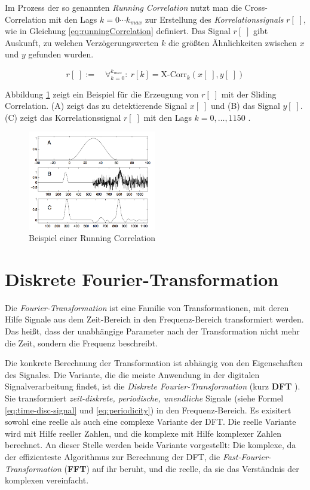 Im Prozess der so genannten \emph{Running Correlation} nutzt man die Cross-Correlation mit den Lags $k = 0 \cdots k_{max}$ zur Erstellung des \emph{Korrelationssignals} $r[\;]$, wie in Gleichung \ref{eq:runningCorrelation} definiert. Das Signal $r[\;]$ gibt Auskunft, zu welchen Verzögerungswerten $k$ die größten Ähnlichkeiten zwischen $x$ und $y$ gefunden wurden. 

\begin{equation}
r[\;] := \quad \mathop{\forall}_{k = 0}^{k_{max}} :\ r[k] = \text{X-Corr}_k(x[\;],y[\;])
\label{eq:runningCorrelation}
\end{equation}

Abbildung \ref{img:slidingCorrelation} zeigt ein Beispiel für die Erzeugung von $r[\;]$ mit der Sliding Correlation. (A) zeigt das zu detektierende Signal $x[\;]$ und (B) das Signal $y[\;]$. (C) zeigt das Korrelationssignal $r[\;]$ mit den Lags $k = 0, \ldots ,1150$ . \cite[S. 47 - 48]{dspMichigan}

\begin{figure}[h]
	\centering
	\includegraphics[width=0.5\textwidth]{bilder/slidingCorrelation.png}
	\caption{Beispiel einer Running Correlation}
	\label{img:slidingCorrelation}
\end{figure}


\section{Diskrete Fourier-Transformation}

Die \emph{Fourier-Transformation} ist eine Familie von Transformationen, mit deren Hilfe Signale aus dem Zeit-Bereich in den Frequenz-Bereich transformiert werden. Das heißt, dass der unabhängige Parameter nach der Transformation nicht mehr die Zeit, sondern die Frequenz beschreibt. 

Die konkrete Berechnung der Transformation ist abhängig von den Eigenschaften des Signales. Die Variante, die die meiste Anwendung in der digitalen Signalverarbeitung findet, ist die \emph{Diskrete Fourier-Transformation} (kurz \textbf{DFT} ). Sie transformiert \emph{zeit-diskrete, periodische, unendliche} Signale (siehe Formel \ref{eq:time-disc-signal} und \ref{eq:periodicity}) in den Frequenz-Bereich. Es exisitert sowohl eine reelle als auch eine complexe Variante der DFT. Die reelle Variante wird mit Hilfe reeller Zahlen, und die komplexe mit Hilfe komplexer Zahlen berechnet. An dieser Stelle werden beide Variante vorgestellt: Die komplexe, da der effizienteste Algorithmus zur Berechnung der DFT, die \emph{Fast-Fourier-Transformation} (\textbf{FFT}) auf ihr beruht, und die reelle, da sie das Verständnis der komplexen vereinfacht.\cite[S. 142 - 146]{dspGuide}

